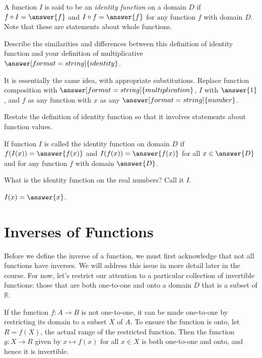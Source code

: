 \documentclass{ximera}
\begin{document}
\begin{definition}
A function $I$ is said to be an \emph{identity function} on a domain $D$ if $f\circ I=\answer{f}$ and $I\circ f = \answer{f}$ for any function $f$ with domain $D$.  Note that these are statements about whole functions.  
\end{definition}

\begin{question}
Describe the similarities and differences between this definition of identity function and your definition of multiplicative $\answer[format=string]{identity}$.  
\begin{question}
It is essentially the same idea, with appropriate substitutions.  Replace function composition with 
$\answer[format=string]{multiplication}$, $I$ with $\answer{1}$, and $f$ as any function with $x$ as any 
$\answer[format=string]{number}$.  
\end{question}
\end{question}

\begin{question}
Restate the definition of identity function so that it involves statements about function values.  
\begin{solution}
If function $I$ is called the identity function on domain $D$ if $f(I(x)) = \answer{f(x)}$ and $I(f(x))=\answer{f(x)}$ for all $x\in \answer{D}$ and for any function $f$ with domain $\answer{D}$.  
\end{solution}
\end{question}

\begin{question}
What is the identity function on the real numbers?  Call it $I$.  

$I(x)=\answer{x}$.
\end{question}

\section*{Inverses of Functions}
Before we define the inverse of a function, we must first acknowledge that not all functions have inverses.  We will address this  issue in more detail later in the course.  For now, let's restrict our attention to a particular collection of invertible functions: those that are both one-to-one and onto a domain $D$ that is a subset of $\mathbb R$.  

\begin{remark}
If the function $f:A\rightarrow B$ is not one-to-one, it can be made one-to-one by restricting its domain to a subset $X$ of $A$.  To ensure the function is onto, let $R=f(X)$, the actual range of the restricted function.  Then the function $g:X\rightarrow R$ given by $x\mapsto f(x)$ for all $x\in X$ is both one-to-one and onto, and hence it is invertible.  
\end{remark}
\end{document}

